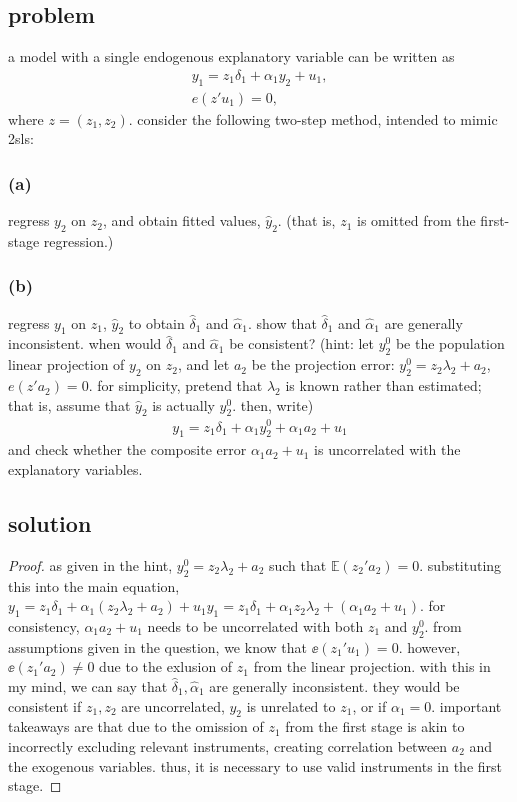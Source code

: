 \documentclass[10pt, a4paper]{article}
\newcommand{\EE}{\mathbb E}
\begin{document}
    \subsection*{problem}
      a model with a single endogenous explanatory variable can be written as
      \begin{gather}
        y_1 = z_1 \delta_1 + \alpha_1 y_2 + u_1, \\
        e(z'u_1) = 0,
      \end{gather}
      where $z = (z_1, z_2)$. consider the following two-step method, intended to mimic 2sls:
    \subsubsection*{(a)}
      regress $y_2$ on $z_2$, and obtain fitted values, $\hat{y}_2$. (that is, $z_1$ is omitted from the first-stage regression.)
    \subsubsection*{(b)}
      regress $y_1$ on $z_1$, $\hat{y}_2$ to obtain $\hat{\delta}_1$ and $\hat{\alpha}_1$. show that $\hat{\delta}_1$ and $\hat{\alpha}_1$ are generally inconsistent. when would $\hat{\delta}_1$ and $\hat{\alpha}_1$ be consistent? (hint: let $y_2^0$ be the population linear projection of $y_2$ on $z_2$, and let $a_2$ be the projection error: $y_2^0 = z_2 \lambda_2 + a_2$, $e(z'a_2) = 0$. for simplicity, pretend that $\lambda_2$ is known rather than estimated; that is, assume that $\hat{y}_2$ is actually $y_2^0$. then, write)
      \begin{gather}
        y_1 = z_1 \delta_1 + \alpha_1 y_2^0 + \alpha_1 a_2 + u_1
      \end{gather}
      and check whether the composite error $\alpha_1 a_2 + u_1$ is uncorrelated with the explanatory variables.
    \subsection*{solution}
      \begin{proof}
        as given in the hint, $y_2^0 = z_2\lambda_2 + a_2$ such that $\EE(z_2'a_2)=0$. substituting this into the main equation, $y_1 = z_1\delta_1+\alpha_1(z_2\lambda_2+a_2)+u_1y_1 = z_1\delta_1 + \alpha_1z_2\lambda_2 + (\alpha_1a_2+u_1)$. for consistency, $\alpha_1a_2 + u_1$ needs to be uncorrelated with both $z_1$ and $y_2^0$. from assumptions given in the question, we know that $\ee(z_1'u_1)=0$. however, $\ee(z_1'a_2)\ne0$ due to the exlusion of $z_1$ from the linear projection. with this in my mind, we can say that $\hat{\delta}_1,\hat{\alpha}_1$ are generally inconsistent. they would be consistent if $z_1, z_2$ are uncorrelated, $y_2$ is unrelated to $z_1$, or if $\alpha_1=0$. important takeaways are that due to the omission of $z_1$ from the first stage is akin to incorrectly excluding relevant instruments, creating correlation between $a_2$ and the exogenous variables. thus, it is necessary to use valid instruments in the first stage. 
      \end{proof}
\end{document}
